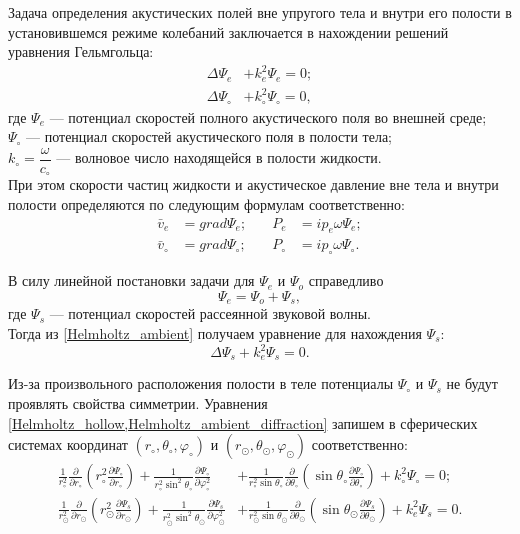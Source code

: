 Задача определения акустических полей вне упругого тела и внутри его полости в установившемся режиме колебаний заключается в нахождении решений уравнения Гельмгольца:
\begin{align}
\Delta\Psi_e &+ k_e^2\Psi_e = 0;\label{Helmholtz_ambient}\\
\Delta\Psi_\circ &+ k_\circ^2\Psi_\circ = 0,\label{Helmholtz_hollow}
\end{align}
где $\Psi_e$ --- потенциал скоростей полного акустического поля во внешней среде;\\
$\Psi_\circ$ --- потенциал скоростей акустического поля в полости тела;\\
$k_\circ = \dfrac{\omega}{c_\circ}$ --- волновое число находящейся в полости жидкости.\\ При этом скорости частиц жидкости и акустическое давление вне тела и внутри полости определяются по следующим формулам соответственно:
\begin{align}
\bar{v}_e &=  grad\Psi_e; &\quad P_e &= ip_e\omega\Psi_e;\label{eq_ven}\\
\bar{v}_\circ &=  grad\Psi_\circ; &\quad P_\circ &= ip_\circ\omega\Psi_\circ.\label{eq_vc}
\end{align}


В силу линейной постановки задачи для $\Psi_e$ и $\Psi_o$ справедливо
\begin{equation} \label{potention_speed_ambient}
\Psi_e = \Psi_o + \Psi_s,
\end{equation}
где $\Psi_s$ --- потенциал скоростей рассеянной звуковой волны.\\
Тогда из \eqref{Helmholtz_ambient} получаем уравнение для нахождения $\Psi_s$:
\begin{equation} \label{Helmholtz_ambient_diffraction}
\Delta\Psi_s + k_e^2\Psi_s = 0.
\end{equation}

Из-за произвольного расположения полости в теле потенциалы $\Psi_\circ$ и $\Psi_s$ не будут проявлять свойства симметрии.
Уравнения \cref{Helmholtz_hollow,Helmholtz_ambient_diffraction} запишем в сферических системах координат $(r_\circ, \theta_\circ, \varphi_\circ)$ и $(r_\odot, \theta_\odot, \varphi_\odot)$ соответственно:
\begin{align}
\frac1{r_\circ^2}\frac\partial{\partial r_\circ}\left(r_\circ^2 \frac{\partial\Psi_\circ}{\partial r_\circ}\right) + \frac1{r_\circ^2\sin^2\theta_\circ}\frac{\partial\Psi_\circ}{\partial\varphi_\circ^2} &+ \frac1{r_\circ^2\sin\theta_\circ}\frac\partial{\partial\theta_\circ} \left(\sin\theta_\circ \frac{\partial\Psi_\circ}{\partial\theta_\circ}\right) + k_\circ^2\Psi_\circ = 0;\\
\frac1{r_\odot^2}\frac\partial{\partial r_\odot}\left(r_\odot^2 \frac{\partial\Psi_s}{\partial r_\odot}\right) + \frac1{r_\odot^2\sin^2\theta_\odot}\frac{\partial\Psi_s}{\partial\varphi_\odot^2} &+ \frac1{r_\odot^2\sin\theta_\odot}\frac\partial{\partial\theta_\odot} \left(\sin\theta_\odot \frac{\partial\Psi_s}{\partial\theta_\odot}\right) + k_e^2\Psi_s = 0.
\end{align}

